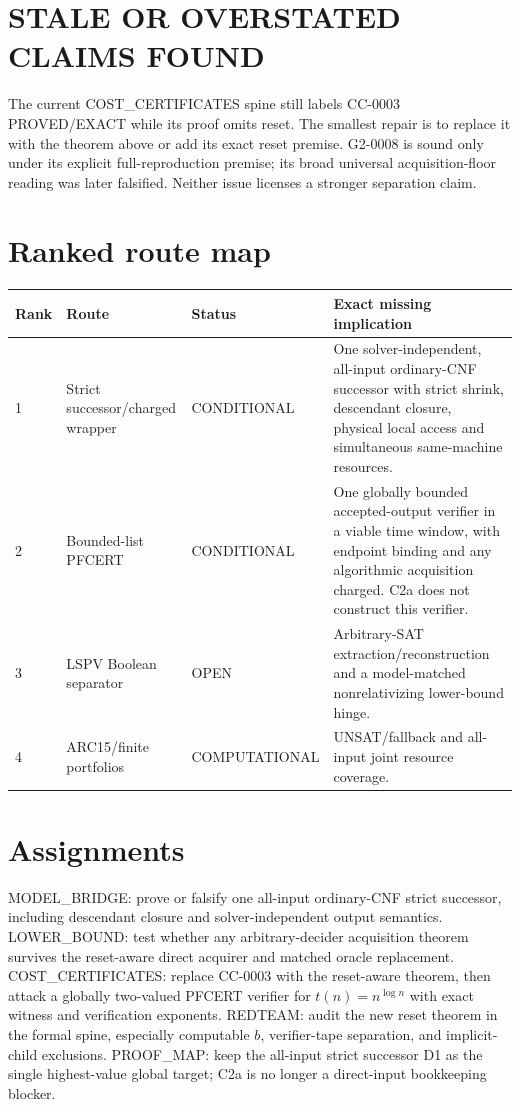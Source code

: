 \documentclass[11pt]{article}
\begin{document}
\section*{STALE OR OVERSTATED CLAIMS FOUND}
The current COST\_CERTIFICATES spine still labels CC-0003 PROVED/EXACT while
its proof omits reset.  The smallest repair is to replace it with the theorem
above or add its exact reset premise.  G2-0008 is sound only under its explicit
full-reproduction premise; its broad universal acquisition-floor reading was
later falsified.  Neither issue licenses a stronger separation claim.

\section*{Ranked route map}
\begin{longtable}{p{}p{}p{}p{}}
\toprule Rank&Route&Status&Exact missing implication\\\midrule\endhead
1&Strict successor/charged wrapper&CONDITIONAL&One solver-independent,
all-input ordinary-CNF successor with strict shrink, descendant closure,
physical local access and simultaneous same-machine resources.\\
2&Bounded-list PFCERT&CONDITIONAL&One globally bounded accepted-output verifier
in a viable time window, with endpoint binding and any algorithmic acquisition
charged.  C2a does not construct this verifier.\\
3&LSPV Boolean separator&OPEN&Arbitrary-SAT extraction/reconstruction and a
model-matched nonrelativizing lower-bound hinge.\\
4&ARC15/finite portfolios&COMPUTATIONAL&UNSAT/fallback and all-input joint
resource coverage.\\
\bottomrule
\end{longtable}

\section*{Assignments}
MODEL\_BRIDGE: prove or falsify one all-input ordinary-CNF strict successor,
including descendant closure and solver-independent output semantics.
LOWER\_BOUND: test whether any arbitrary-decider acquisition theorem survives
the reset-aware direct acquirer and matched oracle replacement.
COST\_CERTIFICATES: replace CC-0003 with the reset-aware theorem, then attack a
globally two-valued PFCERT verifier for $t(n)=n^{\log n}$ with exact witness and
verification exponents.
REDTEAM: audit the new reset theorem in the formal spine, especially computable
$b$, verifier-tape separation, and implicit-child exclusions.
PROOF\_MAP: keep the all-input strict successor D1 as the single highest-value
global target; C2a is no longer a direct-input bookkeeping blocker.
\end{document}
